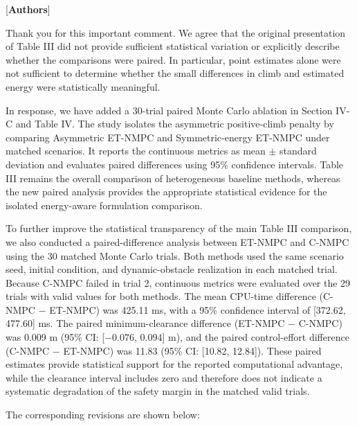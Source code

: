\documentclass[12pt, twosides]{article}
\theoremstyle{definition}
\begin{document}
\textcolor[rgb]{0.00,0.00,1.00}{[\textbf{Authors}]}

Thank you for this important comment. We agree that the original presentation of Table III did not provide sufficient statistical variation or explicitly describe whether the comparisons were paired. In particular, point estimates alone were not sufficient to determine whether the small differences in climb and estimated energy were statistically meaningful.

In response, we have added a 30-trial paired Monte Carlo ablation in Section IV-C and Table IV. The study isolates the asymmetric positive-climb penalty by comparing Asymmetric ET-NMPC and Symmetric-energy ET-NMPC under matched scenarios. It reports the continuous metrics as mean $\pm$ standard deviation and evaluates paired differences using 95\% confidence intervals. Table III remains the overall comparison of heterogeneous baseline methods, whereas the new paired analysis provides the appropriate statistical evidence for the isolated energy-aware formulation comparison.

To further improve the statistical transparency of the main Table III comparison, we also conducted a paired-difference analysis between ET-NMPC and C-NMPC using the 30 matched Monte Carlo trials. Both methods used the same scenario seed, initial condition, and dynamic-obstacle realization in each matched trial. Because C-NMPC failed in trial 2, continuous metrics were evaluated over the 29 trials with valid values for both methods. The mean CPU-time difference (C-NMPC $-$ ET-NMPC) was 425.11 ms, with a 95\% confidence interval of [372.62, 477.60] ms. The paired minimum-clearance difference (ET-NMPC $-$ C-NMPC) was 0.009 m (95\% CI: [$-0.076$, $0.094$] m), and the paired control-effort difference (C-NMPC $-$ ET-NMPC) was 11.83 (95\% CI: [10.82, 12.84]). These paired estimates provide statistical support for the reported computational advantage, while the clearance interval includes zero and therefore does not indicate a systematic degradation of the safety margin in the matched valid trials.

The corresponding revisions are shown below:
\end{document}
